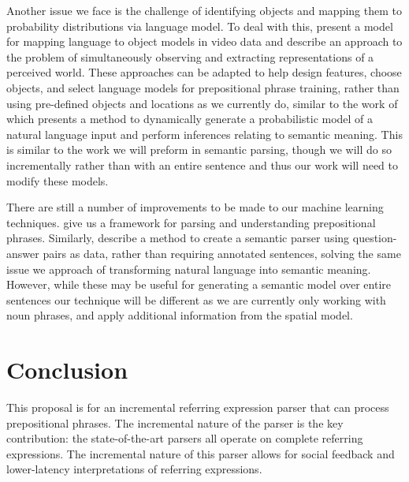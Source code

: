 \documentclass[letterpaper,10pt]{article}
\begin{document}
Another issue we face is the challenge of identifying objects and mapping them to probability distributions via language model. To deal with this, \citet{barbu13} present a model for mapping language to object models in video data and \citet{UW_RSE_ICML2012} describe an approach to the problem of simultaneously observing and extracting representations of a perceived world. These approaches can be adapted to help design features, choose objects, and select language models for prepositional phrase training, rather than using pre-defined objects and locations as we currently do, similar to the work of \citet{tellex2011understanding} which presents a method to dynamically generate a probabilistic model of a natural language input and perform inferences relating to semantic meaning. This is similar to the work we will preform in semantic parsing, though we will do so incrementally rather than with an entire sentence and thus our work will need to modify these models.

There are still a number of improvements to be made to our machine learning techniques. \citet{rudzicz03} give us a framework for parsing and understanding prepositional phrases. Similarly, \citet{liang2013learning} describe a method to create a semantic parser using question-answer pairs as data, rather than requiring annotated sentences, solving the same issue we approach of transforming natural language into semantic meaning. However, while these may be useful for generating a semantic model over entire sentences our technique will be different as we are currently only working with noun phrases, and apply additional information from the spatial model. 

\section{Conclusion}
This proposal is for an incremental referring expression parser that can process prepositional phrases. The incremental nature of the parser is the key contribution: the state-of-the-art parsers all operate on complete referring expressions. The incremental nature of this parser allows for social feedback and lower-latency interpretations of referring expressions.

\clearpage
\printbibliography
\end{document}
